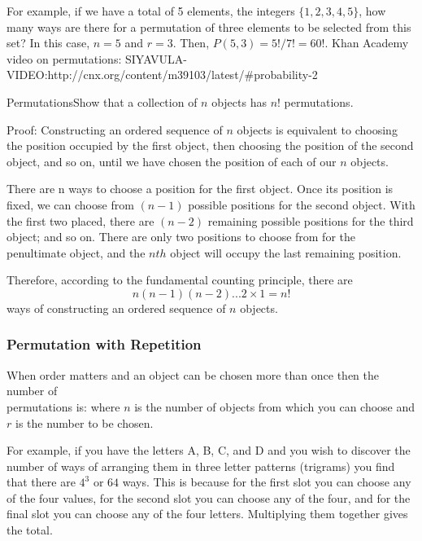 For example, if we have a total of 5 elements, the integers $\{1, 2, 3, 4, 5\}$, how many ways are there for a permutation of three elements to be selected from this set? In this case, $n = 5$ and $r = 3$. Then, $P(5,3) = 5!/7! = 60!$.
Khan Academy video on permutations: SIYAVULA-VIDEO:http://cnx.org/content/m39103/latest/#probability-2
\begin{wex}{Permutations}{Show that a collection of $n$ objects has $n!$ permutations.}{Proof: Constructing an ordered sequence of $n$ objects is equivalent to choosing the position occupied by the first object, then choosing the position of the second object, and so on, until we have chosen the position of each of our $n$ objects.

There are n ways to choose a position for the first object. Once its position is fixed, we can choose from $(n-1)$ possible positions for the second object. With the first two placed, there are $(n-2)$ remaining possible positions for the third object; and so on. There are only two positions to choose from for the penultimate object, and the $nth$ object will occupy the last remaining position.

Therefore, according to the fundamental counting principle, there are $$n(n-1)(n-2)...2 \times 1 = n!$$ ways of constructing an ordered sequence of $n$ objects.
}
\end{wex}

\subsubsection{Permutation with Repetition}

When order matters and an object can be chosen more than once then the number of \\permutations is:
where $n$ is the number of objects from which you can choose and $r$ is the number to be chosen.

For example, if you have the letters A, B, C, and D and you wish to discover the number of ways of arranging them in three letter patterns (trigrams) you find that there are $4^3$ or $64$ ways. This is because for the first slot you can choose any of the four values, for the second slot you can choose any of the four, and for the final slot you can choose any of the four letters. Multiplying them together gives the total.


